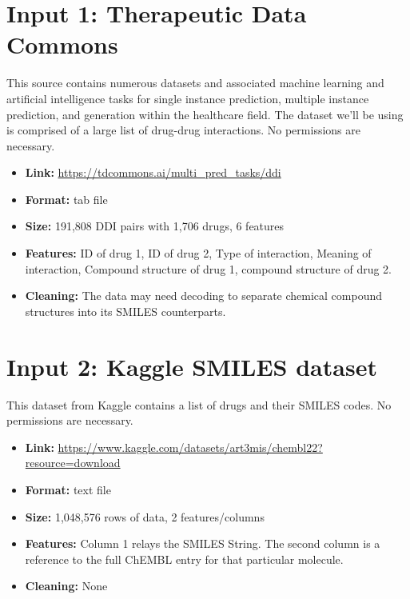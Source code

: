 \documentclass{report}
\begin{document}
\section{Input 1: Therapeutic Data Commons}
This source contains numerous datasets and associated machine learning and artificial intelligence tasks for single instance prediction, multiple instance prediction, and generation within the healthcare field. The dataset we'll be using is comprised of a large list of drug-drug interactions. No permissions are necessary.
\begin{itemize}
    \item \textbf{Link:} \url{https://tdcommons.ai/multi_pred_tasks/ddi}
    \item \textbf{Format:} tab file
    \item \textbf{Size:} 191,808 DDI pairs with 1,706 drugs, 6 features
    \item \textbf{Features:} ID of drug 1, ID of drug 2, Type of interaction, Meaning of interaction, Compound structure of drug 1, compound structure of drug 2.
    \item \textbf{Cleaning:} The data may need decoding to separate chemical compound structures into its SMILES counterparts.
\end{itemize}


\section{Input 2: Kaggle SMILES dataset}
This dataset from Kaggle contains a list of drugs and their SMILES codes. No permissions are necessary.
\begin{itemize}
    \item \textbf{Link:} \url{https://www.kaggle.com/datasets/art3mis/chembl22?resource=download}
    \item \textbf{Format:} text file
    \item \textbf{Size:} 1,048,576 rows of data, 2 features/columns
    \item \textbf{Features:} Column 1 relays the SMILES String. The second column is a reference to the full ChEMBL entry for that particular molecule. 
    \item \textbf{Cleaning:} None
\end{itemize}
\end{document}
